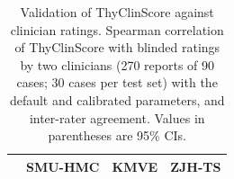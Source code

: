 \begin{table}[p]
\centering
\begin{threeparttable}
\caption{Validation of ThyClinScore against clinician ratings. Spearman correlation of ThyClinScore with blinded ratings by two clinicians (270 reports of 90 cases; 30 cases per test set) with the default and calibrated parameters, and inter-rater agreement. Values in parentheses are 95\% CIs.}
\label{tab:thyclinscore_clinician}

\footnotesize
\setlength{\tabcolsep}{5.0pt}
\renewcommand{\arraystretch}{1.08}

\begin{tabular}{>{\raggedright\arraybackslash}p{}ccc}
\toprule
& \textbf{SMU-HMC} & \textbf{KMVE} & \textbf{ZJH-TS} \\
\midrule


\end{tabular}
\end{threeparttable}
\end{table}
